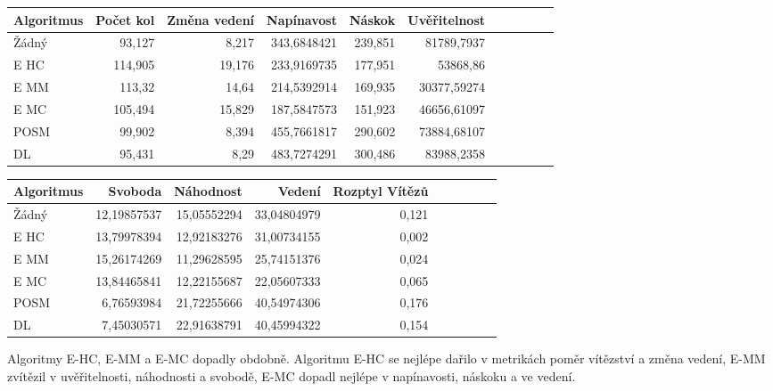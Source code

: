 \begin{table*}[b]\footnotesize
\vspace*{0mm}
\caption{{\label{tab-mazem}} Porovnání metrik zábavnosti u jednotlivých algoritmů ve hře Bludiště. }
\vspace*{0mm}
\label{shadowtable}
\begin{center}
\begin{tabular}{| l || r | r | r | r | r | r | r | r | r | r |}
\hline
Algoritmus & Počet kol	& Změna vedení & Napínavost & Náskok & Uvěřitelnost\\
\hline
\hline
Žádný & 93,127 & 8,217 & 343,6848421 & 239,851 & 81789,7937 \\ \hline  
E HC & 114,905 & 19,176 & 233,9169735 & 177,951 & 53868,86 \\ \hline
E MM & 113,32 & 14,64 & 214,5392914 & 169,935 & 30377,59274 \\ \hline
E MC & 105,494 & 15,829 & 187,5847573 & 151,923 & 46656,61097 \\ \hline
POSM & 99,902 & 8,394 & 455,7661817 & 290,602 & 73884,68107 \\ \hline
DL & 95,431 & 8,29 & 483,7274291 & 300,486 & 83988,2358 \\ \hline
\end{tabular}
\end{center}
\begin{center}
\begin{tabular}{| l || r | r | r | r | r | r | r | r | r |}
\hline
Algoritmus & Svoboda & Náhodnost & Vedení &	Rozptyl Vítězů \\
\hline
\hline
Žádný & 12,19857537 & 15,05552294 & 33,04804979 & 0,121 \\ \hline  
E HC & 13,79978394 & 12,92183276 & 31,00734155 & 0,002 \\ \hline
E MM & 15,26174269 & 11,29628595 & 25,74151376 & 0,024 \\ \hline
E MC & 13,84465841 & 12,22155687 & 22,05607333 & 0,065 \\ \hline
POSM & 6,76593984 & 21,72255666 & 40,54974306 & 0,176 \\ \hline
DL & 7,45030571 & 22,91638791 & 40,45994322 & 0,154 \\ \hline
\end{tabular}
\end{center}
\end{table*}

Algoritmy E-HC, E-MM a E-MC dopadly obdobně. Algoritmu E-HC se nejlépe dařilo v metrikách poměr vítězství a změna vedení, E-MM zvítězil v uvěřitelnosti, náhodnosti a svobodě, E-MC dopadl nejlépe v napínavosti, náskoku a ve vedení.

